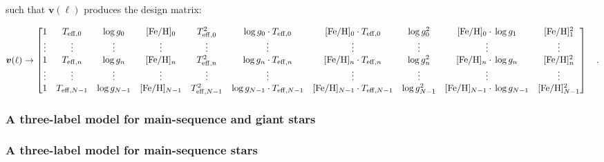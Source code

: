 \documentclass[preprint,trackchanges]{aastex}
\newcommand{\logg}{\log g}
\newcommand{\Dvector}[1]{\boldsymbol{#1}}
\newcommand{\vecv}{\Dvector{v}}
\begin{document}
\noindent{}such that $\vecv(\ell)$ produces the design matrix:
\begin{tiny}
\begin{equation}\label{eq:vectorizer-three-label-design-matrix}
\vecv(\ell) \rightarrow \begin{bmatrix}
	1 & T_{{\rm eff},0} & \logg_{0} & [{\rm Fe/H}]_{0} & T_{{\rm eff},0}^2 & \logg_{0}\cdot{}T_{{\rm eff},0} & [{\rm Fe/H}]_{0}\cdot{}T_{{\rm eff},0} & \logg_{0}^2 & [{\rm Fe/H}]_{0}\cdot{}\logg_1 & [{\rm Fe/H}]_1^2 \\
	\vdots & \vdots & \vdots & \vdots & \vdots & \vdots & \vdots & \vdots & \vdots & \vdots \\
	1 & T_{{\rm eff},n} & \logg_{n} & [{\rm Fe/H}]_{n} & T_{{\rm eff},n}^2 & \logg_{n}\cdot{}T_{{\rm eff},n} & [{\rm Fe/H}]_{n}\cdot{}T_{{\rm eff},n} & \logg_{n}^2 & [{\rm Fe/H}]_{n}\cdot{}\logg_n & [{\rm Fe/H}]_n^2 \\
	\vdots & \vdots & \vdots & \vdots & \vdots & \vdots & \vdots & \vdots & \vdots & \vdots \\
	1 & T_{{\rm eff},N-1} & \logg_{N-1} & [{\rm Fe/H}]_{N-1} & T_{{\rm eff},N-1}^2 & \logg_{N-1}\cdot{}T_{{\rm eff},N-1} & [{\rm Fe/H}]_{N-1}\cdot{}T_{{\rm eff},N-1} & \logg_{N-1}^2 & [{\rm Fe/H}]_{N-1}\cdot{}\logg_{N-1} & [{\rm Fe/H}]_{N-1}^2
\end{bmatrix}\quad .
\end{equation}
\end{tiny}

\subsubsection{A three-label model for main-sequence and giant stars}\label{sec:a-simple-joint-model}

\subsubsection{A three-label model for main-sequence stars}\label{sec:a-simple-model-ms-stars}





\end{document}
